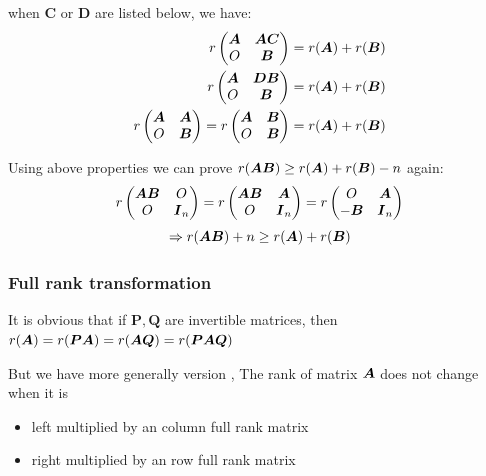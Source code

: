 \documentclass{overview}
\begin{document}
when $\boldsymbol{C}$ or $\boldsymbol{D}$ are listed below, we have:
\[
\begin{aligned}
	r\begin{pmatrix} \boldsymbol{A} & \boldsymbol{A}\boldsymbol{C} \\
			O & \boldsymbol{B} \\ \end{pmatrix}
	= r(\boldsymbol{A})+r(\boldsymbol{B}) \\
	r\begin{pmatrix} \boldsymbol{A} & \boldsymbol{D}\boldsymbol{B} \\
			O & \boldsymbol{B} \\ \end{pmatrix}
	= r(\boldsymbol{A})+r(\boldsymbol{B}) \\
		r\begin{pmatrix} \boldsymbol{A} & \boldsymbol{A} \\
				O & \boldsymbol{B} \\ \end{pmatrix}
	= r\begin{pmatrix} \boldsymbol{A} & \boldsymbol{B} \\
				O & \boldsymbol{B} \\ \end{pmatrix}
	= r(\boldsymbol{A})+r(\boldsymbol{B}) \\
\end{aligned}
\] 

Using above properties we can prove $r(\boldsymbol{A}\boldsymbol{B}) \geq r(\boldsymbol{A})+r(\boldsymbol{B})-n$ again:
\[
r\begin{pmatrix}
	\boldsymbol{A}\boldsymbol{B} & O    \\
	O    & \boldsymbol{I}_n \\
\end{pmatrix}
=
r\begin{pmatrix}
	\boldsymbol{A}\boldsymbol{B} & \boldsymbol{A} \\
	O & \boldsymbol{I}_n \\
\end{pmatrix}
=
r\begin{pmatrix}
	O & \boldsymbol{A} \\
	-\boldsymbol{B} & \boldsymbol{I}_n \\
\end{pmatrix}
\]
\[\Rightarrow
r(\boldsymbol{A}\boldsymbol{B})+n
\geq r(\boldsymbol{A})+r(\boldsymbol{B})
\]

\subsubsection{Full rank transformation}

It is obvious that if $\boldsymbol{P},\boldsymbol{Q}$ are invertible matrices, then $
			r(\boldsymbol{A})=r(\boldsymbol{P}\boldsymbol{A}) = r(\boldsymbol{A}\boldsymbol{Q})
			= r(\boldsymbol{P}\boldsymbol{A}\boldsymbol{Q}) $

But we have more generally version , The rank of matrix $\boldsymbol{A}$ does not change when it is 
\begin{itemize}
	\item left multiplied by an column full rank matrix
	\item right multiplied by an row full rank matrix
\end{itemize}
\end{document}
